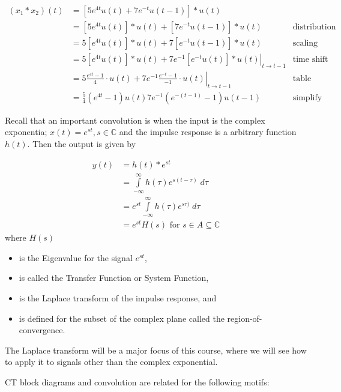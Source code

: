 \documentclass{article}
\begin{document}
\begin{align}
  (x_1 * x_2)(t) &= \left[ 5e^{4t}u(t) + 7e^{-t}u(t-1) \right] * u(t) &\\
  &= \left[ 5e^{4t}u(t) \right] * u(t) + \left[ 7e^{-t}u(t-1) \right] * u(t) & \text{distribution property}\\
  &= 5\left[e^{4t}u(t) \right] * u(t) + 7\left[e^{-t}u(t-1) \right] * u(t) & \text{scaling property}\\
  &= 5\left[e^{4t}u(t) \right] * u(t) + 7e^{-1}\left. \left[e^{-t}u(t) \right] * u(t)\right|_{t\rightarrow t-1} & \text{time shift property}\\
  &= 5 \frac{e^{4t} - 1}{4}\cdot u(t) + 7e^{-1}\left. \frac{e^{-t} - 1}{-1}\cdot u(t)\right|_{t\rightarrow t-1} & \text{table application}\\
  &= \frac{5}{4}\left(e^{4t} -1 \right)u(t) 7e^{-1} \left(e^{-(t-1)} -1 \right)u(t-1) & \text{simplify}
\end{align}

Recall that an important convolution is when the input is the complex exponentia; $x(t) = e^{st}, s\in\mathbb{C}$ and the impulse response is a arbitrary function $h(t)$. Then the output is given by

\begin{align}
  y(t) &= h(t) * e^{st}\\
  &= \int\limits_{-\infty}^{\infty} h(\tau)e^{s(t-\tau)}\; d\tau \\
  &= e^{st} \int\limits_{-\infty}^{\infty} h(\tau)e^{s\tau)}\; d\tau \\
  &= e^{st} H(s) \text{ for } s\in A \subseteq \mathbb{C}
\end{align}
where $H(s)$

\begin{itemize}
\item is the Eigenvalue for the signal $e^{st}$, 
\item is called the Transfer Function or System Function,
\item is the Laplace transform of the impulse response, and
\item is defined for the subset of the complex plane called the region-of-convergence.
\end{itemize}

The Laplace transform will be a major focus of this course, where we will see how to apply it to signals other than the complex exponential.

CT block diagrams and convolution are related for the following motifs:
\end{document}
